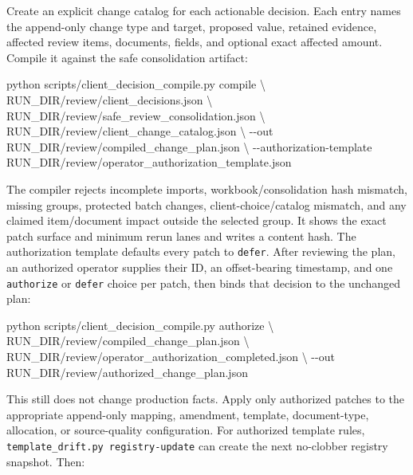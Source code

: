 \documentclass[
]{article}
\newenvironment{Shaded}{}{}
\newcommand{\AttributeTok}[1]{\textcolor[rgb]{0.49,0.56,0.16}{#1}}
\newcommand{\DataTypeTok}[1]{\textcolor[rgb]{0.56,0.13,0.00}{#1}}
\newcommand{\ExtensionTok}[1]{#1}
\newcommand{\NormalTok}[1]{#1}
\begin{document}
Create an explicit change catalog for each actionable decision. Each
entry names the append-only change type and target, proposed value,
retained evidence, affected review items, documents, fields, and
optional exact affected amount. Compile it against the safe
consolidation artifact:

\begin{Shaded}
\begin{Highlighting}[]
\ExtensionTok{python}\NormalTok{ scripts/client\_decision\_compile.py compile }\DataTypeTok{\textbackslash{}}
\NormalTok{  RUN\_DIR/review/client\_decisions.json }\DataTypeTok{\textbackslash{}}
\NormalTok{  RUN\_DIR/review/safe\_review\_consolidation.json }\DataTypeTok{\textbackslash{}}
\NormalTok{  RUN\_DIR/review/client\_change\_catalog.json }\DataTypeTok{\textbackslash{}}
  \AttributeTok{{-}{-}out}\NormalTok{ RUN\_DIR/review/compiled\_change\_plan.json }\DataTypeTok{\textbackslash{}}
  \AttributeTok{{-}{-}authorization{-}template}\NormalTok{ RUN\_DIR/review/operator\_authorization\_template.json}
\end{Highlighting}
\end{Shaded}

The compiler rejects incomplete imports, workbook/consolidation hash
mismatch, missing groups, protected batch changes, client-choice/catalog
mismatch, and any claimed item/document impact outside the selected
group. It shows the exact patch surface and minimum rerun lanes and
writes a content hash. The authorization template defaults every patch
to \texttt{defer}. After reviewing the plan, an authorized operator
supplies their ID, an offset-bearing timestamp, and one
\texttt{authorize} or \texttt{defer} choice per patch, then binds that
decision to the unchanged plan:

\begin{Shaded}
\begin{Highlighting}[]
\ExtensionTok{python}\NormalTok{ scripts/client\_decision\_compile.py authorize }\DataTypeTok{\textbackslash{}}
\NormalTok{  RUN\_DIR/review/compiled\_change\_plan.json }\DataTypeTok{\textbackslash{}}
\NormalTok{  RUN\_DIR/review/operator\_authorization\_completed.json }\DataTypeTok{\textbackslash{}}
  \AttributeTok{{-}{-}out}\NormalTok{ RUN\_DIR/review/authorized\_change\_plan.json}
\end{Highlighting}
\end{Shaded}

This still does not change production facts. Apply only authorized
patches to the appropriate append-only mapping, amendment, template,
document-type, allocation, or source-quality configuration. For
authorized template rules,
\texttt{template\_\allowbreak{}drift.py registry-\allowbreak{}update}
can create the next no-clobber registry snapshot. Then:
\end{document}
